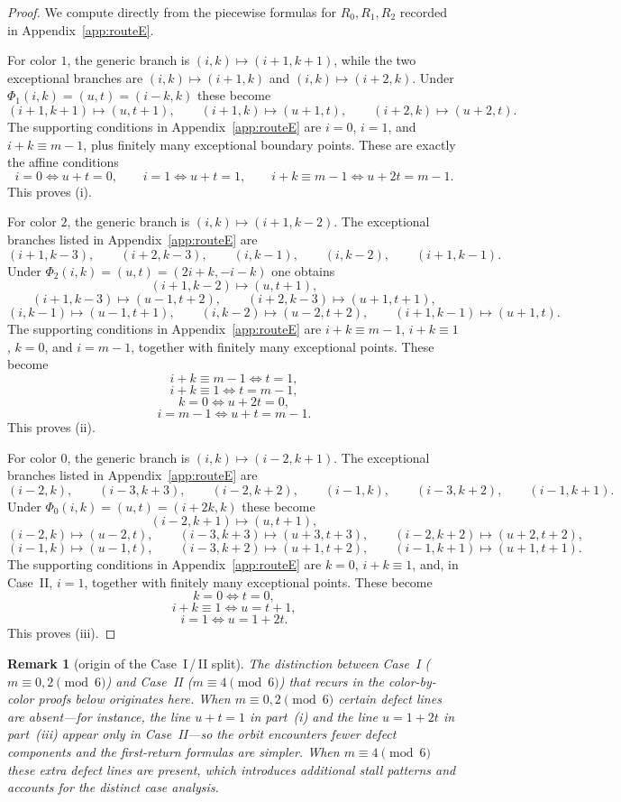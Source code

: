 \documentclass[11pt]{article}
\newtheorem{remark}{Remark}
\begin{document}
\begin{proof}
We compute directly from the piecewise formulas for $R_0,R_1,R_2$ recorded in Appendix~\ref{app:routeE}.

For color $1$, the generic branch is $(i,k)\mapsto(i+1,k+1)$, while the two exceptional branches are $(i,k)\mapsto(i+1,k)$ and $(i,k)\mapsto(i+2,k)$.
Under $\Phi_1(i,k)=(u,t)=(i-k,k)$ these become
\[
(i+1,k+1)\mapsto (u,t+1),\qquad (i+1,k)\mapsto (u+1,t),\qquad (i+2,k)\mapsto (u+2,t).
\]
The supporting conditions in Appendix~\ref{app:routeE} are $i=0$, $i=1$, and $i+k\equiv m-1$, plus finitely many exceptional boundary points.
These are exactly the affine conditions
\[
i=0 \iff u+t=0,\qquad i=1 \iff u+t=1,\qquad i+k\equiv m-1 \iff u+2t=m-1.
\]
This proves \textup{(i)}.

For color $2$, the generic branch is $(i,k)\mapsto(i+1,k-2)$.
The exceptional branches listed in Appendix~\ref{app:routeE} are
\[
(i+1,k-3),\qquad (i+2,k-3),\qquad (i,k-1),\qquad (i,k-2),\qquad (i+1,k-1).
\]
Under $\Phi_2(i,k)=(u,t)=(2i+k,-i-k)$ one obtains
\[
(i+1,k-2)\mapsto (u,t+1),
\]
\[
(i+1,k-3)\mapsto (u-1,t+2),\qquad (i+2,k-3)\mapsto (u+1,t+1),
\]
\[
(i,k-1)\mapsto (u-1,t+1),\qquad (i,k-2)\mapsto (u-2,t+2),\qquad (i+1,k-1)\mapsto (u+1,t).
\]
The supporting conditions in Appendix~\ref{app:routeE} are $i+k\equiv m-1$, $i+k\equiv 1$, $k=0$, and $i=m-1$, together with finitely many exceptional points.
These become
\[
i+k\equiv m-1 \iff t=1,
\]
\[
i+k\equiv 1 \iff t=m-1,
\]
\[
k=0 \iff u+2t=0,
\]
\[
i=m-1 \iff u+t=m-1.
\]
This proves \textup{(ii)}.

For color $0$, the generic branch is $(i,k)\mapsto(i-2,k+1)$.
The exceptional branches listed in Appendix~\ref{app:routeE} are
\[
(i-2,k),\qquad (i-3,k+3),\qquad (i-2,k+2),\qquad (i-1,k),\qquad (i-3,k+2),\qquad (i-1,k+1).
\]
Under $\Phi_0(i,k)=(u,t)=(i+2k,k)$ these become
\[
(i-2,k+1)\mapsto (u,t+1),
\]
\[
(i-2,k)\mapsto (u-2,t),\qquad (i-3,k+3)\mapsto (u+3,t+3),\qquad (i-2,k+2)\mapsto (u+2,t+2),
\]
\[
(i-1,k)\mapsto (u-1,t),\qquad (i-3,k+2)\mapsto (u+1,t+2),\qquad (i-1,k+1)\mapsto (u+1,t+1).
\]
The supporting conditions in Appendix~\ref{app:routeE} are $k=0$, $i+k\equiv 1$, and, in Case~II, $i=1$, together with finitely many exceptional points.
These become
\[
k=0 \iff t=0,
\]
\[
i+k\equiv 1 \iff u=t+1,
\]
\[
i=1 \iff u=1+2t.
\]
This proves \textup{(iii)}.
\end{proof}

\begin{remark}[origin of the Case~I\,/\,II split]
\label{rem:mod6-split}
The distinction between Case~I ($m\equiv 0,2\pmod 6$) and Case~II ($m\equiv 4\pmod 6$) that recurs in the color-by-color proofs below originates here.
When $m\equiv 0,2\pmod 6$ certain defect lines are absent---for instance, the line $u+t=1$ in part~\textup{(i)} and the line $u=1+2t$ in part~\textup{(iii)} appear only in Case~II---so the orbit encounters fewer defect components and the first-return formulas are simpler.
When $m\equiv 4\pmod{6}$ these extra defect lines are present, which introduces additional stall patterns and accounts for the distinct case analysis.
\end{remark}
\end{document}
